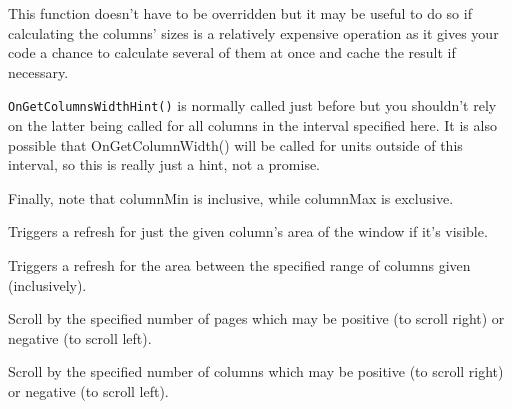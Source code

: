 \label{wxvarhscrollhelperongetcolumnswidthhint}


This function doesn't have to be overridden but it may be useful to do so if
calculating the columns' sizes is a relatively expensive operation as it gives
your code a chance to calculate several of them at once and cache the result
if necessary.

{\tt OnGetColumnsWidthHint()} is normally called just before
 but you
shouldn't rely on the latter being called for all columns in the interval
specified here. It is also possible that OnGetColumnWidth() will be called for
units outside of this interval, so this is really just a hint, not a promise.

Finally, note that columnMin is inclusive, while columnMax is exclusive.


\label{wxvarhscrollhelperrefreshcolumn}


Triggers a refresh for just the given column's area of the window if it's visible.


\label{wxvarhscrollhelperrefreshcolumns}


Triggers a refresh for the area between the specified range of columns given
(inclusively).


\label{wxvarhscrollhelperscrollcolumnpages}


Scroll by the specified number of pages which may be positive (to scroll right)
or negative (to scroll left).


\label{wxvarhscrollhelperscrollcolumns}


Scroll by the specified number of columns which may be positive (to scroll right)
or negative (to scroll left).

